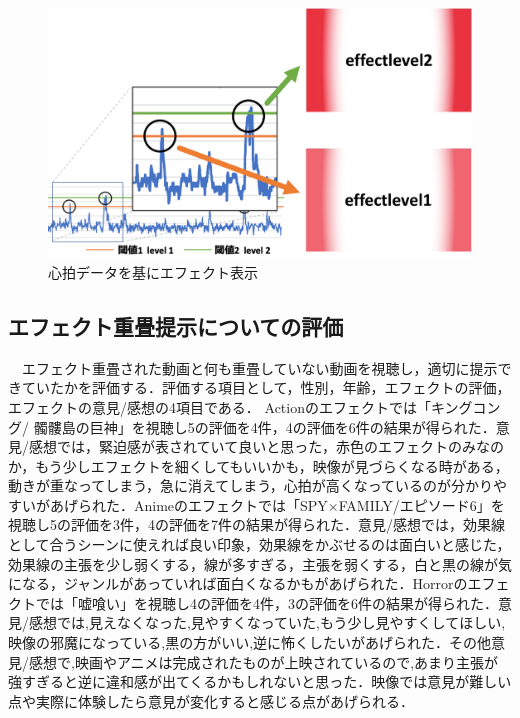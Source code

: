 \begin{figure}[H]
    \centering
    \includegraphics[width=13cm]{images/chapter4/effectupp.pdf}
    \caption{心拍データを基にエフェクト表示}
    \label{efecthyouka}
\end{figure}

\subsection{エフェクト重畳提示についての評価}

　エフェクト重畳された動画と何も重畳していない動画を視聴し，適切に提示できていたかを評価する．評価する項目として，性別，年齢，エフェクトの評価，エフェクトの意見/感想の4項目である．
Actionのエフェクトでは「キングコング/ 髑髏島の巨神」を視聴し5の評価を4件，4の評価を6件の結果が得られた．意見/感想では，緊迫感が表されていて良いと思った，赤色のエフェクトのみなのか，もう少しエフェクトを細くしてもいいかも，映像が見づらくなる時がある，動きが重なってしまう，急に消えてしまう，心拍が高くなっているのが分かりやすいがあげられた．Animeのエフェクトでは「SPY×FAMILY/エピソード6」を視聴し5の評価を3件，4の評価を7件の結果が得られた．意見/感想では，効果線として合うシーンに使えれば良い印象，効果線をかぶせるのは面白いと感じた，効果線の主張を少し弱くする，線が多すぎる，主張を弱くする，白と黒の線が気になる，ジャンルがあっていれば面白くなるかもがあげられた．Horrorのエフェクトでは「嘘喰い」を視聴し4の評価を4件，3の評価を6件の結果が得られた．意見/感想では,見えなくなった,見やすくなっていた,もう少し見やすくしてほしい,映像の邪魔になっている,黒の方がいい,逆に怖くしたいがあげられた．その他意見/感想で,映画やアニメは完成されたものが上映されているので,あまり主張が強すぎると逆に違和感が出てくるかもしれないと思った．映像では意見が難しい点や実際に体験したら意見が変化すると感じる点があげられる．

